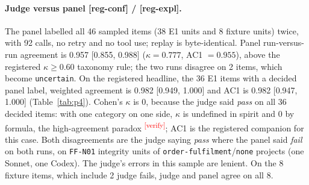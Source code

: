 \documentclass[10pt,a4paper]{article}
\newcommand{\citeneeded}[1]{\cite{#1}\textsuperscript{\textcolor{red}{\tiny[verify]}}}
\newcommand{\regC}{\textsf{\scriptsize[reg-conf]}}  %
\newcommand{\regX}{\textsf{\scriptsize[reg-expl]}}  %
\newcommand{\ff}[1]{\texttt{\small #1}}
\newcommand{\lev}[1]{\texttt{\small #1}}
\begin{document}
\paragraph{Judge versus panel \regC{} / \regX{}.} The panel labelled all 46 sampled items (38 E1 units and 8 fixture
units) twice, with 92 calls, no retry and no tool use; replay is byte-identical. %
Panel run-versus-run agreement is 0.957 [0.855, 0.988] ($\kappa = 0.777$, AC1 $= 0.955$), above the registered
$\kappa \geq 0.60$ taxonomy rule; the two runs disagree on 2 items, which become \texttt{uncertain}.
On the registered headline, the 36 E1 items with a decided panel label, weighted agreement is 0.982 [0.949, 1.000]
and AC1 is 0.982 [0.947, 1.000] (Table~\ref{tab:p4}). %
Cohen's $\kappa$ is 0, because the judge said \emph{pass} on all 36 decided items: with one category on one side, $\kappa$ is
undefined in spirit and 0 by formula, the high-agreement paradox \citeneeded{feinstein1990paradox}; AC1 is the
registered companion for this case. %
Both disagreements are the judge saying \emph{pass} where the panel said \emph{fail} on both runs, on
\ff{FF-N01} integrity units of \texttt{order-fulfilment}/\lev{none} projects (one Sonnet, one Codex). The judge's
errors in this sample are lenient. %
On the 8 fixture items, which include 2 judge fails, judge and panel agree on all 8.
\end{document}
